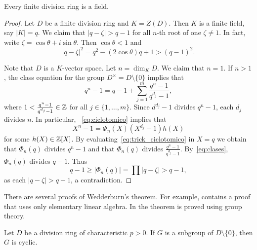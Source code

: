 \begin{theorem}[Wedderburn]
\label{thm:Wedderburn} 
	Every finite division ring is a field. 
\end{theorem}

\begin{proof}
    Let $D$ be a finite division ring   
	and $K=Z(D)$. Then $K$ is a finite field, say $|K|=q$. 
	We claim that $|q-\zeta|>q-1$ for all $n$-th 
	root of one $\zeta\ne 1$.  In fact, write $\zeta=\cos\theta+i\sin\theta$. Then 
	$\cos\theta<1$ and 
	\[
	|q-\zeta|^2=q^2-(2\cos\theta)q+1>(q-1)^2.
	\]
	
	Note that
	$D$ is a $K$-vector space. Let 
	$n=\dim_KD$.  We claim that $n=1$. If $n>1$, the 
	class equation for the group 
	$D^\times=D\setminus\{0\}$ 
        implies that 
	\begin{equation}
		\label{eq:clases}
		q^n-1=q-1+\sum_{j=1}^m \frac{q^n-1}{q^{d_j}-1},
	\end{equation}
	where $1<\frac{q^n-1}{q^{d_j}-1}\in\mathbb{Z}$ for all $j\in\{1,\dots,m\}$. 
	Since $d^{d_j}-1$ divides $q^n-1$, each $d_j$ divides $n$. In particular,
	~\eqref{eq:ciclotomico} implies that 
	\begin{equation}
		\label{eq:trick_ciclotomico}
		X^n-1=\Phi_n(X)(X^{d_j}-1)h(X)
	\end{equation}
	for some $h(X)\in\mathbb{Z}[X]$. 
	By evaluating~\eqref{eq:trick_ciclotomico} in $X=q$  
	we obtain that $\Phi_n(q)$ divides $q^n-1$ and that $\Phi_n(q)$
	divides $\frac{q^n-1}{q^{d_j}-1}$. By~\eqref{eq:clases}, 
	$\Phi_n(q)$ divides $q-1$. 
	Thus  
	\[
		q-1\geq |\Phi_n(q)|=\prod |q-\zeta|>q-1,
	\]
	as each $|q-\zeta|>q-1$, 
	a contradiction. 
\end{proof}

There are several proofs of Wedderburn's theorem. 
For example, \cite{MR360687} contains a proof that uses only 
elementary linear algebra. In \cite[Chapter 14]{MR896269}
the theorem is proved using group theory. 

\begin{theorem}
\label{thm:division}
    Let $D$ be a division ring of characteristic $p>0$. 
    If $G$ is a subgroup of $D\setminus\{0\}$, then 
    $G$ is cyclic. 
\end{theorem}

